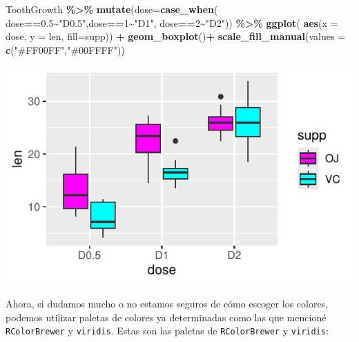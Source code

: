 \documentclass[
]{book}
\newenvironment{Shaded}{\begin{snugshade}}{\end{snugshade}}
\newcommand{\AttributeTok}[1]{\textcolor[rgb]{0.13,0.29,0.53}{#1}}
\newcommand{\DecValTok}[1]{\textcolor[rgb]{0.00,0.00,0.81}{#1}}
\newcommand{\FloatTok}[1]{\textcolor[rgb]{0.00,0.00,0.81}{#1}}
\newcommand{\FunctionTok}[1]{\textcolor[rgb]{0.13,0.29,0.53}{\textbf{#1}}}
\newcommand{\NormalTok}[1]{#1}
\newcommand{\SpecialCharTok}[1]{\textcolor[rgb]{0.81,0.36,0.00}{\textbf{#1}}}
\newcommand{\StringTok}[1]{\textcolor[rgb]{0.31,0.60,0.02}{#1}}
\begin{document}
\begin{Shaded}
\begin{Highlighting}[]
\NormalTok{ToothGrowth }\SpecialCharTok{\%\textgreater{}\%}  \FunctionTok{mutate}\NormalTok{(}\AttributeTok{dose=}\FunctionTok{case\_when}\NormalTok{(}
\NormalTok{  dose}\SpecialCharTok{==}\FloatTok{0.5}\SpecialCharTok{\textasciitilde{}}\StringTok{"D0.5"}\NormalTok{,dose}\SpecialCharTok{==}\DecValTok{1}\SpecialCharTok{\textasciitilde{}}\StringTok{"D1"}\NormalTok{, dose}\SpecialCharTok{==}\DecValTok{2}\SpecialCharTok{\textasciitilde{}}\StringTok{"D2"}\NormalTok{)) }\SpecialCharTok{\%\textgreater{}\%} \FunctionTok{ggplot}\NormalTok{(}
    \FunctionTok{aes}\NormalTok{(}\AttributeTok{x =}\NormalTok{ dose, }\AttributeTok{y =}\NormalTok{ len, }\AttributeTok{fill=}\NormalTok{supp)) }\SpecialCharTok{+}  \FunctionTok{geom\_boxplot}\NormalTok{()}\SpecialCharTok{+}
  \FunctionTok{scale\_fill\_manual}\NormalTok{(}\AttributeTok{values =} \FunctionTok{c}\NormalTok{(}\StringTok{"\#FF00FF"}\NormalTok{,}\StringTok{"\#00FFFF"}\NormalTok{))}
\end{Highlighting}
\end{Shaded}

\begin{center}\includegraphics{R_Manual_files/figure-latex/unnamed-chunk-213-1} \end{center}

\hfill\break
Ahora, si dudamos mucho o no estamos seguros de cómo escoger los colores, podemos utilizar paletas de colores ya determinadas como las que mencioné \texttt{RColorBrewer} y \texttt{viridis}. Estas son las paletas de \texttt{RColorBrewer} y \texttt{viridis}:
\end{document}
